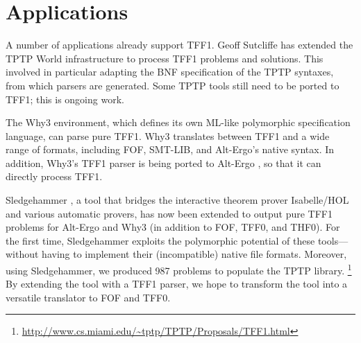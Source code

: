 \section{Applications}
\label{sec_apps}

A number of applications already support TFF1. Geoff
Sutcliffe has extended the TPTP World infrastructure to process TFF1 problems
and solutions. This involved in particular adapting the BNF specification of the
TPTP syntaxes, from which parsers are generated. Some TPTP tools still need to be
ported to TFF1; this is ongoing work.

The Why3 \cite{bobot-et-al-2011} environment, which defines its own ML-like
polymorphic specification language, can parse pure TFF1. Why3 translates
between TFF1 and a wide range of
formats, including FOF, SMT-LIB, and
Alt-Ergo's native syntax. In addition, Why3's TFF1 parser is being ported to
Alt-Ergo \cite{bobot-et-al-2008}, so that it can directly process TFF1. %

Sledgehammer \cite{paulson-blanchette-2010}, a tool that bridges the interactive
theorem prover Isabelle\slash HOL and various automatic provers, has now been
extended to output pure TFF1 problems for Alt-Ergo and Why3
(in addition to FOF, TFF0, and THF0). For the first time, Sledgehammer
exploits the polymorphic potential of these tools---without having
to implement their (incompatible) native file formats.
Moreover, using Sledgehammer, we produced 987 problems to populate the TPTP
library.%
\footnote{\url{http://www.cs.miami.edu/~tptp/TPTP/Proposals/TFF1.html}}
By extending the tool with a TFF1 parser,
we hope to transform the tool into a versatile translator to FOF and
TFF0.



